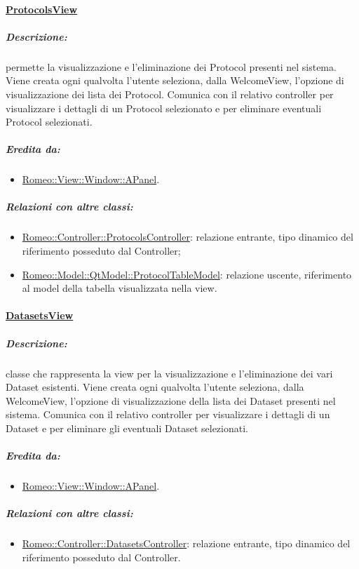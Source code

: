 	\paragraph{\underline{ProtocolsView}}
	\label{vpv} 
		\subparagraph{Descrizione:} permette la visualizzazione e l'eliminazione dei Protocol\glossario{} presenti nel sistema. Viene creata ogni qualvolta l'utente seleziona, dalla WelcomeView, l'opzione di visualizzazione dei lista dei Protocol\glossario{}. Comunica con il relativo controller per visualizzare i dettagli di un Protocol\g{} selezionato e per eliminare eventuali Protocol\glossario{} selezionati.
		\subparagraph{Eredita da:}
			\begin{itemize}
				\item \hyperref[ab_panel]{Romeo::View::Window::APanel}.
			\end{itemize}
		\subparagraph{Relazioni con altre classi:}
			\begin{itemize}
				\item \hyperref[controller_sp]{Romeo::Controller::ProtocolsController}: relazione entrante, tipo dinamico del riferimento posseduto dal Controller;
				\item \hyperref[controller_tm]{Romeo::Model::QtModel::ProtocolTableModel}: relazione uscente, riferimento al model della tabella visualizzata nella view.
			\end{itemize}
		
	\paragraph{\underline{DatasetsView}}
	\label{vdv} 
		\subparagraph{Descrizione:} classe che rappresenta la view per la visualizzazione e l'eliminazione dei vari Dataset\glossario{} esistenti. Viene creata ogni qualvolta l'utente seleziona, dalla WelcomeView, l'opzione di visualizzazione della lista dei Dataset\glossario{} presenti nel sistema. Comunica con il relativo controller per visualizzare i dettagli di un Dataset\glossario{} e per eliminare gli eventuali Dataset\glossario{} selezionati.
		\subparagraph{Eredita da:}
			\begin{itemize}
				\item \hyperref[ab_panel]{Romeo::View::Window::APanel}.
			\end{itemize}
		\subparagraph{Relazioni con altre classi:}
			\begin{itemize}
				\item \hyperref[controller_sd]{Romeo::Controller::DatasetsController}: relazione entrante, tipo dinamico del riferimento posseduto dal Controller.
			\end{itemize}
		
